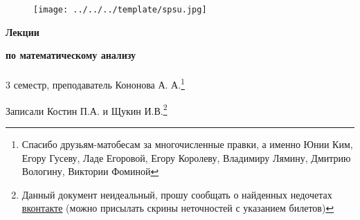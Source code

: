 \documentclass[main]{subfiles}
\begin{document}
	\begin{figure}[H]
			\texttt{[image: ../../../template/spsu.jpg]}
			\centering
	\end{figure}
	\vspace*{\fill}
	\begin{center}
		\huge \textbf{Лекции}

		\huge \textbf{по математическому анализу}\\ \ \\
		\Large 3 семестр, преподаватель Кононова А. А.\footnote{Спасибо друзьям-матобесам за многочисленные правки, а именно Юнии Ким, Егору Гусеву, Ладе Егоровой, Егору Королеву, Владимиру Лямину, Дмитрию Вологину, Виктории Фоминой}

		\large Записали Костин П.А. и Щукин И.В.\footnote{Данный документ неидеальный, прошу сообщать о найденных недочетах \href{https://vk.com/drab_existence_a}{вконтакте} (можно присылать скрины неточностей с указанием билетов)}
	\end{center}
	\vspace*{\fill}
	\vspace*{\fill}

	\newpage
	\tableofcontents
	\newpage
\end{document}
